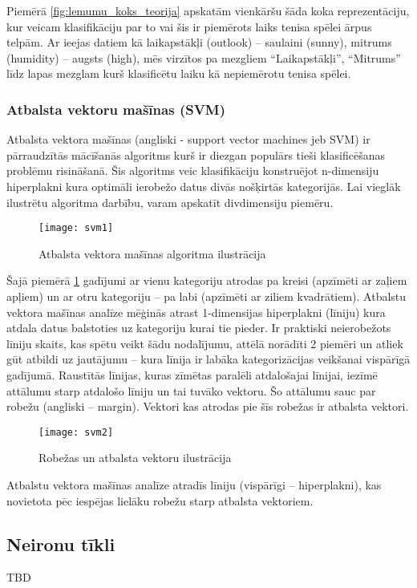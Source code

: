 Piemērā \ref{fig:lemumu_koks_teorija} apskatām vienkāršu šāda koka reprezentāciju, kur veicam klasifikāciju par to vai šis ir piemērots laiks tenisa spēlei ārpus telpām. Ar ieejas datiem kā laikapstākļi (outlook) – saulaini (sunny), mitrums (humidity) – augsts (high), mēs virzītos pa mezgliem “Laikapstākļi”, “Mitrums” līdz lapas mezglam kurš klasificētu laiku kā nepiemērotu tenisa spēlei.

\subsubsection{Atbalsta vektoru mašīnas (SVM)}

Atbalsta vektora mašīnas \cite{supportvectornetworks} (angliski - support vector machines jeb SVM) ir pārraudzītās mācīšanās algoritms kurš ir diezgan populārs tieši klasificēšanas problēmu risināšanā. Šis algoritms veic klasifikāciju konstruējot n-dimensiju hiperplakni kura optimāli ierobežo datus divās nošķirtās kategorijās. Lai vieglāk ilustrētu algoritma darbību, varam apskatīt divdimensiju piemēru.
\begin{figure}[H]
	\texttt{[image: svm1]}
	\caption{Atbalsta vektora mašīnas algoritma ilustrācija \cite{supportvectornetworks} }
	\label{fig:svm1}
\end{figure}
Šajā piemērā \ref{fig:svm1} gadījumi ar vienu kategoriju atrodas pa kreisi (apzīmēti ar zaļiem apļiem) un ar otru kategoriju – pa labi (apzīmēti ar ziliem kvadrātiem). Atbalstu vektora mašīnas analīze mēģinās atrast 1-dimensijas hiperplakni (līniju) kura atdala datus balstoties uz kategoriju kurai tie pieder. Ir praktiski neierobežots līniju skaits, kas spētu veikt šādu nodalījumu, attēlā norādīti 2 piemēri un atliek gūt atbildi uz jautājumu – kura līnija ir labāka kategorizācijas veikšanai vispārīgā gadījumā. Raustītās līnijas, kuras zīmētas paralēli atdalošajai līnijai, iezīmē attālumu starp atdalošo līniju un tai tuvāko vektoru. Šo attālumu sauc par robežu (angliski – margin). Vektori kas atrodas pie šīs robežas ir atbalsta vektori.
\begin{figure}[H]
	\texttt{[image: svm2]}
	\caption{Robežas un atbalsta vektoru ilustrācija \cite{supportvectornetworks} }
	\label{fig:svm2}
\end{figure}
Atbalstu vektora mašīnas analīze atradīs līniju (vispārīgi – hiperplakni), kas novietota pēc iespējas lielāku robežu starp atbalsta vektoriem.

\subsection{Neironu tīkli}
TBD

